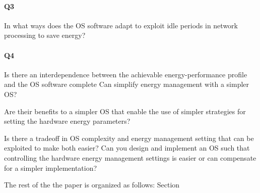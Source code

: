 \paragraph{Q3} 
\label{sec:Q3}
In what ways does the OS software adapt to exploit idle periods in network processing to save energy?
\paragraph{Q4}
\label{sec:Q4}
Is there an interdependence between the achievable energy-performance profile and the OS software complete
Can simplify energy management with a simpler OS?

Are their benefits to a simpler OS that enable the use of simpler strategies for setting the hardware energy parameters?

Is there a tradeoff in OS complexity and energy management setting that can be exploited to make both easier?
Can you design and implement an OS such that controlling the hardware energy management settings is easier or can compensate for a simpler implementation? 






The rest of the the paper is organized as follows: Section

